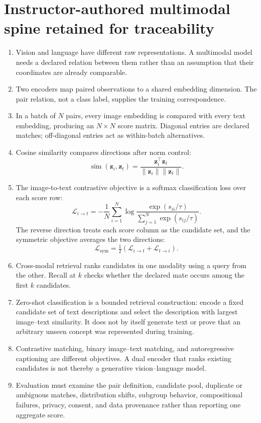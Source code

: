 \documentclass{article}
\begin{document}
\section{Instructor-authored multimodal spine retained for traceability}

\begin{enumerate}
  \item Vision and language have different raw representations. A multimodal model
  needs a declared relation between them rather than an assumption that their
  coordinates are already comparable.
  \item Two encoders map paired observations to a shared embedding dimension. The
  pair relation, not a class label, supplies the training correspondence.
  \item In a batch of $N$ pairs, every image embedding is compared with every text
  embedding, producing an $N\times N$ score matrix. Diagonal entries are declared
  matches; off-diagonal entries act as within-batch alternatives.
  \item Cosine similarity compares directions after norm control:
  \[
    \operatorname{sim}(\mathbf z_i,\mathbf z_t)
    =\frac{\mathbf z_i^\top\mathbf z_t}
    {\lVert\mathbf z_i\rVert\lVert\mathbf z_t\rVert}.
  \]
  \item The image-to-text contrastive objective is a softmax classification loss
  over each score row:
  \[
    \mathcal L_{i\rightarrow t}
    =-\frac1N\sum_{i=1}^{N}
    \log\frac{\exp(s_{ii}/\tau)}
    {\sum_{j=1}^{N}\exp(s_{ij}/\tau)}.
  \]
  The reverse direction treats each score column as the candidate set, and the
  symmetric objective averages the two directions:
  \[
    \mathcal L_{\mathrm{sym}}
    =\tfrac12(\mathcal L_{i\rightarrow t}+\mathcal L_{t\rightarrow i}).
  \]
  \item Cross-modal retrieval ranks candidates in one modality using a query from
  the other. Recall at $k$ checks whether the declared mate occurs among the first
  $k$ candidates.
  \item Zero-shot classification is a bounded retrieval construction: encode a
  fixed candidate set of text descriptions and select the description with largest
  image--text similarity. It does not by itself generate text or prove that an
  arbitrary unseen concept was represented during training.
  \item Contrastive matching, binary image--text matching, and autoregressive
  captioning are different objectives. A dual encoder that ranks existing candidates
  is not thereby a generative vision--language model.
  \item Evaluation must examine the pair definition, candidate pool, duplicate or
  ambiguous matches, distribution shifts, subgroup behavior, compositional failures,
  privacy, consent, and data provenance rather than reporting one aggregate score.
\end{enumerate}
\end{document}
